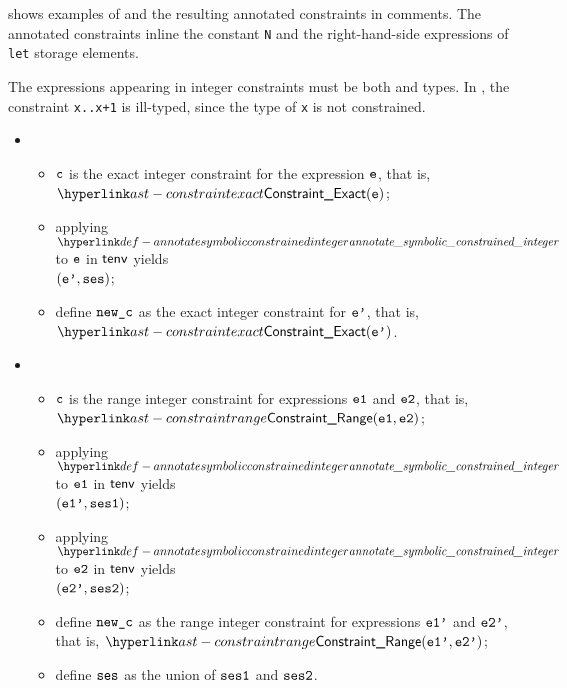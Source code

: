  shows examples of \wellconstrainedintegertypes{}
and the resulting annotated constraints in comments.
The annotated constraints inline the constant \texttt{N} and the right-hand-side
expressions of \texttt{let} storage elements.

The expressions appearing in integer constraints must be both
\symbolicallyevaluable{} and \constrainedinteger{} types.
%
In , the constraint
\verb|x..x+1| is ill-typed, since the type of \texttt{x} is not constrained.

\ProseParagraph
\OneApplies
\begin{itemize}
  \item {}
  \begin{itemize}
    \item $\texttt{c}$ is the exact integer constraint for the expression $\texttt{e}$, that is, \\ $\ConstraintExact(\ve)$;
    \item applying $\annotatesymbolicconstrainedinteger$ to $\texttt{e}$ in $\textsf{tenv}$ yields \\
          $(\texttt{e'}, \texttt{ses})$\ProseOrTypeError;
    \item define $\texttt{new\_c}$ as the exact integer constraint for $\texttt{e'}$, that is, $\ConstraintExact(\vep)$.
  \end{itemize}

  \item {}
  \begin{itemize}
    \item $\texttt{c}$ is the range integer constraint for expressions $\texttt{e1}$ and $\texttt{e2}$, that is, \\ $\ConstraintRange(\veone, \vetwo)$;
    \item applying $\annotatesymbolicconstrainedinteger$ to $\texttt{e1}$ in $\textsf{tenv}$ yields\\ $(\texttt{e1'}, \texttt{ses1})$\ProseOrTypeError;
    \item applying $\annotatesymbolicconstrainedinteger$ to $\texttt{e2}$ in $\textsf{tenv}$ yields\\ $(\texttt{e2'}, \texttt{ses2})$\ProseOrTypeError;
    \item define $\texttt{new\_c}$ as the range integer constraint for expressions $\texttt{e1'}$ and $\texttt{e2'}$, that is, $\ConstraintRange(\veonep, \vetwop)$;
    \item define $\texttt{ses}$ as the union of $\texttt{ses1}$ and $\texttt{ses2}$.
  \end{itemize}
\end{itemize}


